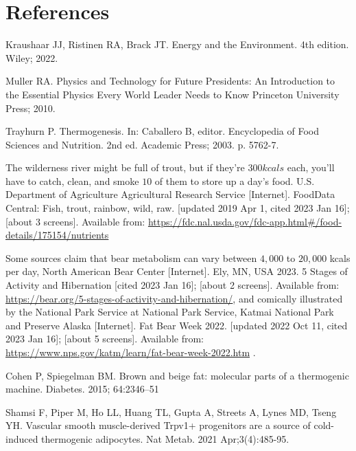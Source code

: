 \documentclass[12pt]{iopart}
\begin{document}
\section*{References}
\begin{thebibliography}{99}

Kraushaar JJ, Ristinen RA, Brack JT.
Energy and the Environment. 4th edition.
Wiley; 2022.

Muller RA.
Physics and Technology for Future Presidents: An Introduction to the Essential Physics Every World Leader Needs to Know
Princeton University Press; 2010.

Trayhurn P.
Thermogenesis.
In: Caballero B, editor.
Encyclopedia of Food Sciences and Nutrition. 2nd ed.
Academic Press;
2003.
p. 5762-7.

The wilderness river might be full of trout, but if they're $300kcals$ each, you'll have to catch, clean, and smoke $10$ of them to store up a day's food.
U.S. Department of Agriculture Agricultural Research Service [Internet].
FoodData Central: Fish, trout, rainbow, wild, raw.
[updated 2019 Apr 1, cited 2023 Jan 16]; [about 3 screens].
Available from: \url{https://fdc.nal.usda.gov/fdc-app.html#/food-details/175154/nutrients}

Some sources claim that bear metabolism can vary between $4,000$ to $20,000$ kcals per day, 
North American Bear Center [Internet]. 
Ely, MN, USA 2023. 
5 Stages of Activity and Hibernation
[cited 2023 Jan 16]; [about 2 screens].
Available from: \url{https://bear.org/5-stages-of-activity-and-hibernation/}, 
and comically illustrated by the National Park Service at 
National Park Service, Katmai National Park and Preserve Alaska [Internet].
Fat Bear Week 2022.
[updated 2022 Oct 11, cited 2023 Jan 16]; [about 5 screens].
Available from: \url{https://www.nps.gov/katm/learn/fat-bear-week-2022.htm} .


Cohen P, Spiegelman BM.
Brown and beige fat: molecular parts of a thermogenic machine.
Diabetes.
2015;
64:2346–51

Shamsi F, Piper M, Ho LL, Huang TL, Gupta A, Streets A, Lynes MD, Tseng YH. 
Vascular smooth muscle-derived Trpv1+ progenitors are a source of cold-induced thermogenic adipocytes. 
Nat Metab. 
2021 Apr;3(4):485-95.


\end{thebibliography}
\end{document}
